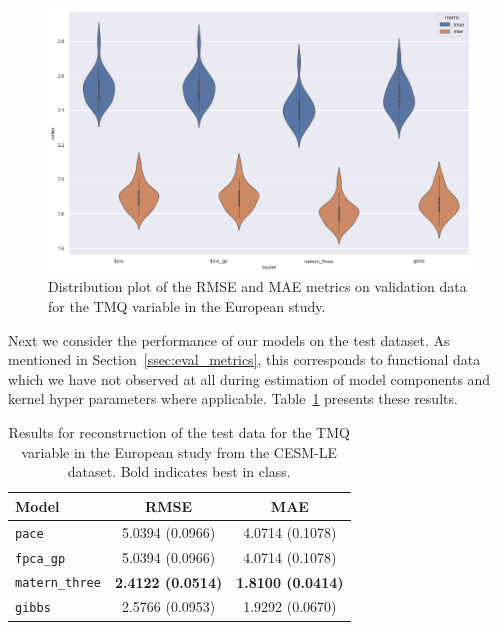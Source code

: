 \begin{figure}
	\centering
	\includegraphics[width=\textwidth]{cesm_tmq_eur_dist}
	\caption{Distribution plot of the RMSE and MAE metrics on validation data for the TMQ variable in the European study.}
	\label{fig:cesm_tmq_eur_dist}
\end{figure}

Next we consider the performance of our models on the test dataset.
As mentioned in Section~\ref{ssec:eval_metrics}, this corresponds to functional data which we have not observed at all during estimation of model components and kernel hyper parameters where applicable.
Table~\ref{tab:test_cesm_tmq_eur} presents these results.

\begin{table}
	\caption[Results for TMQ variable on test data in the European study]{Results for reconstruction of the test data for the TMQ variable in the European study from the CESM-LE dataset. Bold indicates best in class.}
	\centering
	\label{tab:test_cesm_tmq_eur}
	\begin{tabular}{lcc}
		\toprule
		\textbf{Model} & \textbf{RMSE} & \textbf{MAE} \\
		\midrule
		\verb*|pace| & 5.0394 (0.0966) & 4.0714	(0.1078) \\
		\verb*|fpca_gp| & 5.0394 (0.0966) & 4.0714 (0.1078) \\
		\verb*|matern_three| & \textbf{2.4122 (0.0514)} & \textbf{1.8100 (0.0414)}\\
		\verb*|gibbs| & 2.5766 (0.0953) & 1.9292 (0.0670)\\
		\bottomrule
	\end{tabular}
\end{table}

